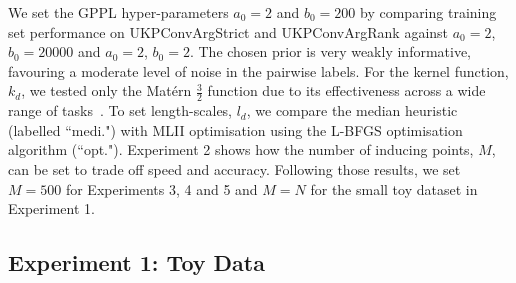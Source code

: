 We set the GPPL hyper-parameters $a_0=2$ and $b_0=200$ by comparing
training set performance on UKPConvArgStrict and UKPConvArgRank against $a_0=2$, $b_0=20000$ and $a_0=2$, $b_0=2$.
The chosen prior is very weakly informative, favouring a moderate level of noise in the pairwise labels.
For the kernel function, $k_d$, we tested only the 
Mat\'ern $\frac{3}{2}$ function due to its 
effectiveness across a wide range of tasks~\cite{rasmussen_gaussian_2006}.
To set length-scales, $l_d$, we compare the median heuristic (labelled ``medi.")
with MLII optimisation using the L-BFGS optimisation algorithm (``opt."). Experiment 2 shows how
the number of inducing points, $M$, can be set to trade off speed and accuracy. 
Following those results, we set $M=500$ for Experiments 3, 4 and 5 and $M=N$ for the small toy dataset in Experiment 1.

\subsection{Experiment 1: Toy Data}

